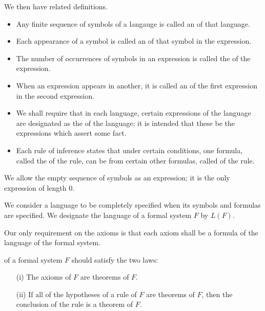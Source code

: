 We then have related definitions.
\begin{itemize}
    \item Any finite sequence of symbols of a langauge is called an  of that language.
    \item Each appearance of a symbol is called an  of that symbol in the expression.
    \item The number of occurrences of symbols in an expression is called the  of the expression.
    \item When an expression appears in another, it is called an  of the first expression in the second expression.
    \item We shall require that in each language, certain expressions of the language are designated as the  of the language; it is intended that these be the expressions which assert some fact.
    \item Each rule of inference states that under certain conditions, one formula, called the  of the rule, can be  from certain other formulas, called  of the rule.
\end{itemize}

\begin{remark}
 We allow the empty sequence of symbols as an expression;
 it is the only expression of length 0.
 \end{remark}

We consider a language to be completely specified when its symbols and formulas are specified.
We designate the language of a formal system $F$ by $L(F)$.

Our only requirement on the axioms is that each axiom shall be a formula of the language of the formal system.

\begin{shaded*}
 of a formal system $F$ should satisfy the two laws:
\begin{enumerate}
    \item[(i)\label{axioms are theorems}] The axioms of $F$ are theorems of $F$.
    \item[(ii)\label{inductions are theorems}] If all of the hypotheses of a rule of $F$ are theorems of $F$, then the conclusion of the rule is a theorem of $F$.
\end{enumerate}
\end{shaded*}

